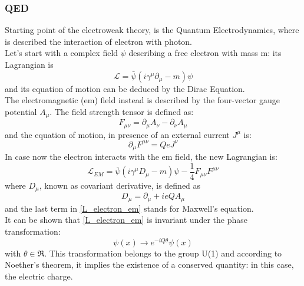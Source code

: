 \subsubsection{QED}\label{QED}
Starting point of the electroweak theory, is the  Quantum Electrodynamics, where is described the interaction of electron with photon.\\
Let's start with a complex field $\psi$ describing a free electron with mass m: its Lagrangian is
\begin{equation}
\mathcal{L} = \bar{\psi}(i\gamma^{\mu}\partial_{\mu}-m)\psi
\label{L_electron}
\end{equation}
and its equation of motion can be deduced by the Dirac Equation.\\%
The electromagnetic (em)  field instead is described by the four-vector gauge potential $A_{\mu}$. The field strength tensor is defined as:
\begin{equation}
F_{\mu\nu} = \partial_{\mu}A_{\nu} - \partial_{\nu}A_{\mu}
\label{F_em}
\end{equation}
and the equation of motion, in presence of an external current $J^{\mu}$ is:
\begin{equation}
\partial_{\mu}F^{\mu\nu} = QeJ^{\nu}
\label{Motion_em}
\end{equation}
In case now the electron interacts with the em field, the new Lagrangian is:
\begin{equation}
\mathcal{L}_{EM} = \bar{\psi}(i\gamma^{\mu}D_{\mu}-m)\psi - \frac{1}{4}F_{\mu\nu}F^{\mu\nu}
\label{L_electron_em}
\end{equation}
where $D_{\mu}$, known as covariant derivative, is defined as
\begin{equation}
D_{\mu} = \partial_{\mu} + ieQA_{\mu}
\label{D_covariante}
\end{equation}
and the last term in \ref{L_electron_em} stands for Maxwell's equation. \\
It can be shown that \ref{L_electron_em} is invariant under the phase transformation:
\begin{equation}
\psi(x)\to e^{-iQ\theta} \psi(x)
\label{global_trans}
\end{equation}
with $\theta \in \Re$. This transformation belongs to the group U(1) and according to Noether's theorem, it implies the existence of a conserved quantity: in this case, the electric charge.
